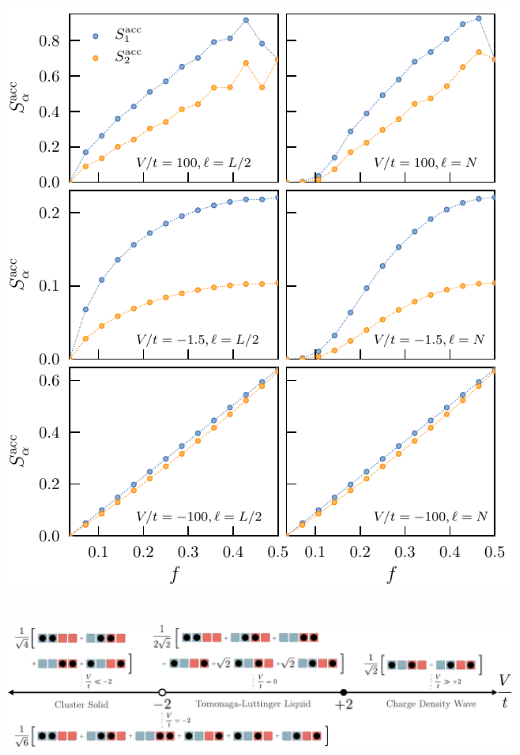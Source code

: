 	\subsection{}
		\includegraphics{fillingFractionDependence}
				
	\subsection{}		
		\includegraphics{phaseDiagramTV}
				





	
